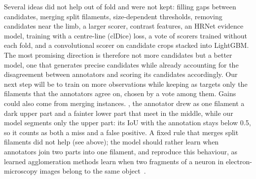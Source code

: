 \documentclass[sigconf]{acmart}
\begin{document}
Several ideas did not help out of fold and were not kept: filling gaps between candidates, merging split filaments, size-dependent thresholds, removing candidates near the limb, a larger scorer, contrast features, an HRNet evidence model, training with a centre-line (clDice) loss, a vote of scorers trained without each fold, and a convolutional scorer on candidate crops stacked into LightGBM. The most promising direction is therefore not more candidates but a better model, one that generates precise candidates while already accounting for the disagreement between annotators and scoring its candidates accordingly. Our next step will be to train on more observations while keeping as targets only the filaments that the annotators agree on, chosen by a vote among them. Gains could also come from merging instances. , the annotator drew as one filament a dark upper part and a fainter lower part that meet in the middle, while our model segments only the upper part: its IoU with the annotation stays below 0.5, so it counts as both a miss and a false positive. A fixed rule that merges split filaments did not help (see above); the model should rather learn when annotators join two parts into one filament, and reproduce this behaviour, as learned agglomeration methods learn when two fragments of a neuron in electron-microscopy images belong to the same object~\cite{nuneziglesias2013gala}.


\section{\texorpdfstring{}{Acknowledgment}}\label{sec:acknowledgment}





\end{document}
